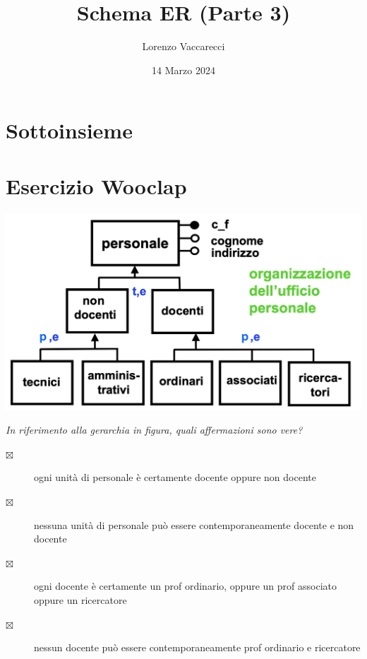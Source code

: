 \documentclass[12pt]{article}
\title{Schema ER (Parte 3)}
\author{Lorenzo Vaccarecci}
\date{14 Marzo 2024}
\begin{document}
\maketitle
\section{Sottoinsieme}
\begin{center}
\end{center}
\section{Esercizio Wooclap}
\begin{center}
\includegraphics[width=\textwidth]{modelloer1.png}
\end{center}
\textit{In riferimento alla gerarchia in figura, quali affermazioni sono vere?}\\
\begin{description}
    \item[$\boxtimes$] ogni unità di personale è certamente docente oppure non docente
    \item[$\boxtimes$] nessuna unità di personale può essere contemporaneamente docente e non docente
    \item[$\boxtimes$] ogni docente è certamente un prof ordinario, oppure un prof associato oppure un ricercatore
    \item[$\boxtimes$] nessun docente può essere contemporaneamente prof ordinario e ricercatore 
\end{description}
\end{document}
